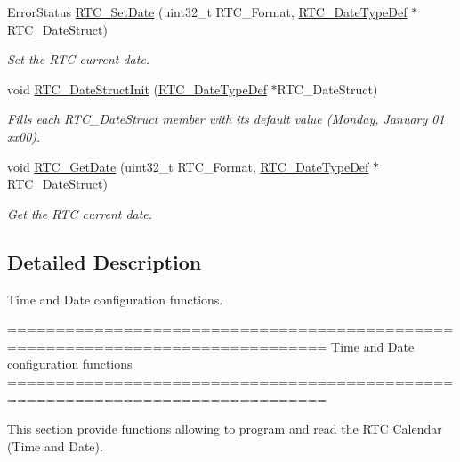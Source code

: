 \begin{DoxyCompactItemize}
Error\-Status \hyperlink{group___r_t_c___group2_ga69d08538147f3d89c818dcfabf50e362}{R\-T\-C\-\_\-\-Set\-Date} (uint32\-\_\-t R\-T\-C\-\_\-\-Format, \hyperlink{struct_r_t_c___date_type_def}{R\-T\-C\-\_\-\-Date\-Type\-Def} $\ast$R\-T\-C\-\_\-\-Date\-Struct)
\begin{DoxyCompactList}\small\item\em Set the R\-T\-C current date. \end{DoxyCompactList}\item 
void \hyperlink{group___r_t_c___group2_ga6e4e99be910d7759f8910056a2985056}{R\-T\-C\-\_\-\-Date\-Struct\-Init} (\hyperlink{struct_r_t_c___date_type_def}{R\-T\-C\-\_\-\-Date\-Type\-Def} $\ast$R\-T\-C\-\_\-\-Date\-Struct)
\begin{DoxyCompactList}\small\item\em Fills each R\-T\-C\-\_\-\-Date\-Struct member with its default value (Monday, January 01 xx00). \end{DoxyCompactList}\item 
void \hyperlink{group___r_t_c___group2_ga582645d554cdd4a316213e90f0b4c8ae}{R\-T\-C\-\_\-\-Get\-Date} (uint32\-\_\-t R\-T\-C\-\_\-\-Format, \hyperlink{struct_r_t_c___date_type_def}{R\-T\-C\-\_\-\-Date\-Type\-Def} $\ast$R\-T\-C\-\_\-\-Date\-Struct)
\begin{DoxyCompactList}\small\item\em Get the R\-T\-C current date. \end{DoxyCompactList}\end{DoxyCompactItemize}


\subsection{Detailed Description}
Time and Date configuration functions. \begin{DoxyVerb} ===============================================================================
                   Time and Date configuration functions
 ===============================================================================  

  This section provide functions allowing to program and read the RTC Calendar
  (Time and Date).\end{DoxyVerb}
 

